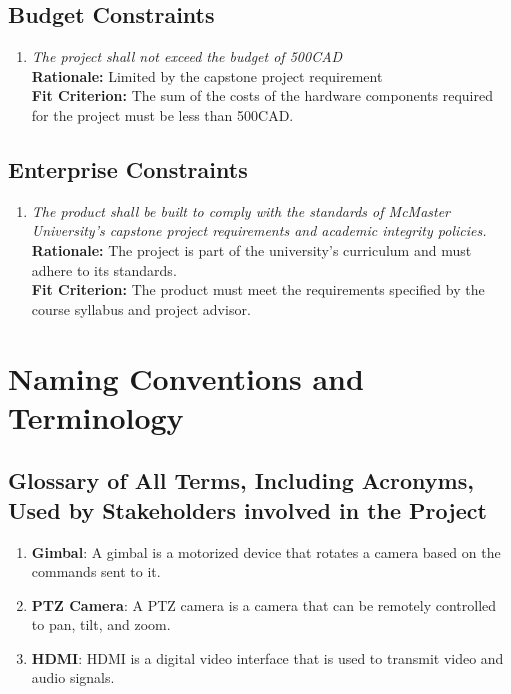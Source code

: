 \documentclass[12pt]{article}
\begin{document}
\subsection{Budget Constraints}

\begin{enumerate}[label=BDGT \arabic*., wide=0pt, leftmargin=*]
  \item \emph{The project shall not exceed the budget of 500CAD}\\[2mm]
        {\bf Rationale:} Limited by the capstone project requirement\\
        {\bf Fit Criterion:} The sum of the costs of the hardware components required for the project must be less than 500CAD.
\end{enumerate}

\subsection{Enterprise Constraints}

\begin{enumerate}[label=ENTP \arabic*., wide=0pt, leftmargin=*]
  \item \emph{The product shall be built to comply with the standards
          of McMaster University's capstone project requirements and
          academic integrity policies.}\\[2mm]
        {\bf Rationale:} The project is part of the university's
        curriculum and must adhere to its standards.\\
        {\bf Fit Criterion:} The product must meet the requirements
        specified by the course syllabus and project advisor.
\end{enumerate}

\section{Naming Conventions and Terminology}
\subsection{Glossary of All Terms, Including Acronyms, Used by Stakeholders
  involved in the Project}

\begin{enumerate}
  \item \textbf{Gimbal}: A gimbal is a motorized device that rotates a camera
        based on the commands sent to it.
  \item \textbf{PTZ Camera}: A PTZ camera is a camera that can be remotely
        controlled to pan, tilt, and zoom.
  \item \textbf{HDMI}: HDMI is a digital video interface that is used to
        transmit video and audio signals.
\end{enumerate}
\end{document}
